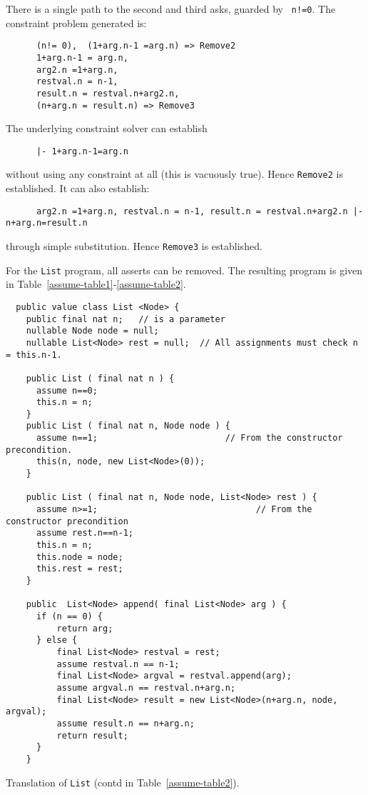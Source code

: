 \documentclass{article}
\begin{document}
\noindent There is a single path to the second and third asks, guarded by {\tt
n!=0}. The constraint problem generated is:
{\footnotesize
  \begin{verbatim}
      (n!= 0),  (1+arg.n-1 =arg.n) => Remove2
      1+arg.n-1 = arg.n,
      arg2.n =1+arg.n,
      restval.n = n-1, 
      result.n = restval.n+arg2.n,
      (n+arg.n = result.n) => Remove3
\end{verbatim}}
\noindent  The underlying constraint solver can establish
{\footnotesize
  \begin{verbatim}
      |- 1+arg.n-1=arg.n
\end{verbatim}}
without using any constraint at all (this is vacuously true). Hence
{\tt Remove2} is established. It can also establish:
{\footnotesize
  \begin{verbatim}
      arg2.n =1+arg.n, restval.n = n-1, result.n = restval.n+arg2.n |- n+arg.n=result.n
\end{verbatim}}
\noindent through simple substitution. Hence {\tt Remove3} is established.

For the {\tt List} program, all asserts can be removed. The resulting
program is given in Table~\ref{assume-table1}-\ref{assume-table2}.

\begin{table}
{\footnotesize
\begin{verbatim}
  public value class List <Node> {
    public final nat n;   // is a parameter
    nullable Node node = null;
    nullable List<Node> rest = null;  // All assignments must check n = this.n-1.

    public List ( final nat n ) {
      assume n==0;
      this.n = n;
    }
    public List ( final nat n, Node node ) {
      assume n==1;                         // From the constructor precondition.
      this(n, node, new List<Node>(0));
    }

    public List ( final nat n, Node node, List<Node> rest ) {
      assume n>=1;                               // From the constructor precondition
      assume rest.n==n-1;
      this.n = n;
      this.node = node;
      this.rest = rest;
    }

    public  List<Node> append( final List<Node> arg ) {
      if (n == 0) {
          return arg;
      } else {
          final List<Node> restval = rest;
          assume restval.n == n-1;
          final List<Node> argval = restval.append(arg);
          assume argval.n == restval.n+arg.n;
          final List<Node> result = new List<Node>(n+arg.n, node, argval);
          assume result.n == n+arg.n;
          return result;
      }
    }
\end{verbatim}}
\caption{Translation of {\tt List} (contd in Table~\ref{assume-table2}).}\label{assume-table1}
\end{table}
\end{document}
